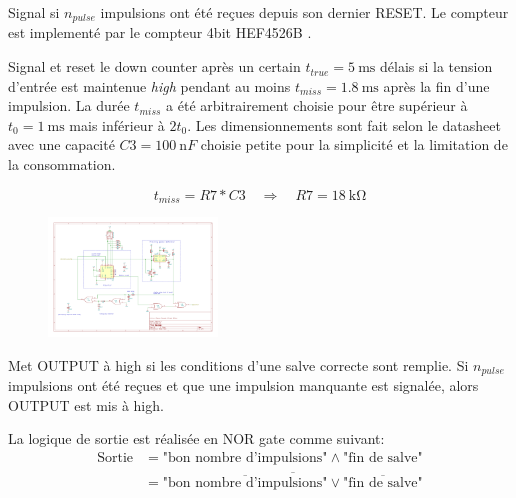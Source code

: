 \documentclass[french]{layout/Report}
\begin{document}
\begin{description}[leftmargin=!,labelwidth=4cm, labelindent=\parindent]
	\item[Down counter]
        Signal si $n_{pulse}$ impulsions ont été reçues depuis son dernier RESET.
        Le compteur est implementé par le compteur 4bit HEF4526B \cite{HEF4526B}.

	\item[Missing pulse detector]
        Signal et reset le down counter après un certain $t_{true} = \SI{5}{\milli\second}$ délais si la tension d'entrée est maintenue \emph{high} pendant au moins $t_{miss} = \SI{1.8}{\milli\second}$ après la fin d'une impulsion.
        La durée $t_{miss}$ a été arbitrairement choisie pour être supérieur à $t_0 = \SI{1}{\milli\second}$ mais inférieur à $2t_0$.
        Les dimensionnements sont fait selon le datasheet \cite{TLC555} avec une capacité $\mathit{C3} = \SI{100}{\nano F}$ choisie petite pour la simplicité et la limitation de la consommation.

		\begin{equation*}
			t_{miss} = \mathit{R7}*\mathit{C3} \quad\Rightarrow\quad \mathit{R7} = \SI{18}{\kilo\ohm}
		\end{equation*}

		\begin{figure}[H]
			\centering
			\includegraphics[width=0.4\textwidth]{fig/missing_pulse_detector.pdf}
		\end{figure}


	\item[Logic]
        Met OUTPUT à high si les conditions d'une salve correcte sont remplie.
        Si $n_{pulse}$ impulsions ont été reçues et que une impulsion manquante est signalée, alors OUTPUT est mis à high. 

        La logique de sortie est réalisée en NOR gate comme suivant:
        \begin{align*}
        \text{Sortie} & = \text{"bon nombre d'impulsions"} \land \text{"fin de salve"} \\
        & = \overline{\overline{\text{"bon nombre d'impulsions"}} \lor \overline{\text{"fin de salve"}}}
        \end{align*}


\end{description}
\end{document}
